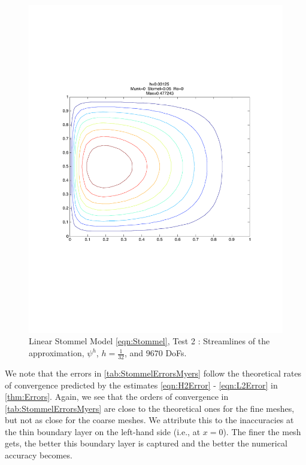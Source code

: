 \begin{figure}%
  \begin{center}
    \includegraphics[scale=0.5]{Figures/LinearStommelMyers.pdf}
    \caption{Linear Stommel Model \eqref{eqn:Stommel}, Test 2 \cite{Myers}: Streamlines of the approximation,
    $\psi^h$, $h=\frac{1}{32}$, and $9670$ DoFs.}
    \label{fig:StommelMyers}
  \end{center}
\end{figure}

We note that the errors in \autoref{tab:StommelErrorsMyers} follow the
theoretical rates of convergence predicted by the estimates \eqref{eqn:H2Error}
- \eqref{eqn:L2Error} in \autoref{thm:Errors}. Again, we see that the orders of
convergence in \autoref{tab:StommelErrorsMyers} are close to the theoretical
ones for the fine meshes, but not as close for the coarse meshes. We attribute
this to the inaccuracies at the thin boundary layer on the left-hand side (i.e.,
at $x=0$). The finer the mesh gets, the better this boundary layer is captured
and the better the numerical accuracy becomes.

